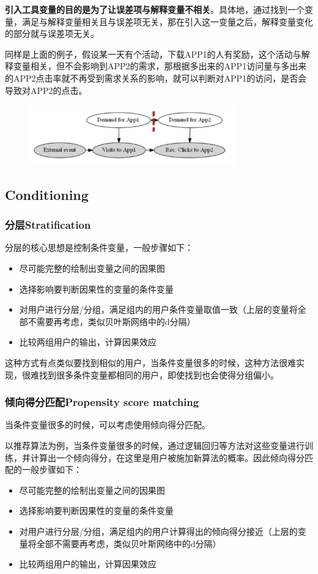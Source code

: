 \documentclass[12pt]{article}
\begin{document}
\textbf{引入工具变量的目的是为了让误差项与解释变量不相关}。具体地，通过找到一个变量，满足与解释变量相关且与误差项无关，那在引入这一变量之后，解释变量变化的部分就与误差项无关。

同样是上面的例子，假设某一天有个活动，下载APP1的人有奖励，这个活动与解释变量相关，但不会影响到APP2的需求，那根据多出来的APP1访问量与多出来的APP2点击率就不再受到需求关系的影响，就可以判断对APP1的访问，是否会导致对APP2的点击。
\begin{figure}[H]
    \centering
    \includegraphics[width=0.8\textwidth]{fig/CasualInference-APP-User-Example2.png}
\end{figure}

\subsection{Conditioning}
\subsubsection{分层Stratification}
分层的核心思想是控制条件变量，一般步骤如下：
\begin{itemize}
\setlength{\itemsep}{0pt}
\setlength{\parsep}{0pt}
\setlength{\parskip}{0pt}
    \item 尽可能完整的绘制出变量之间的因果图
    \item 选择影响要判断因果性的变量的条件变量
    \item 对用户进行分层/分组，满足组内的用户条件变量取值一致（上层的变量将全部不需要再考虑，类似贝叶斯网络中的d分隔）
    \item 比较两组用户的输出，计算因果效应
\end{itemize}
这种方式有点类似要找到相似的用户，当条件变量很多的时候，这种方法很难实现，很难找到很多条件变量都相同的用户，即使找到也会使得分组偏小。

\subsubsection{倾向得分匹配Propensity score matching}
当条件变量很多的时候，可以考虑使用倾向得分匹配。

以推荐算法为例，当条件变量很多的时候，通过逻辑回归等方法对这些变量进行训练，并计算出一个倾向得分，在这里是用户被施加新算法的概率。因此倾向得分匹配的一般步骤如下：
\begin{itemize}
\setlength{\itemsep}{0pt}
\setlength{\parsep}{0pt}
\setlength{\parskip}{0pt}
    \item 尽可能完整的绘制出变量之间的因果图
    \item 选择影响要判断因果性的变量的条件变量
    \item 对用户进行分层/分组，满足组内的用户计算得出的倾向得分接近（上层的变量将全部不需要再考虑，类似贝叶斯网络中的d分隔）
    \item 比较两组用户的输出，计算因果效应
\end{itemize}
\end{document}
